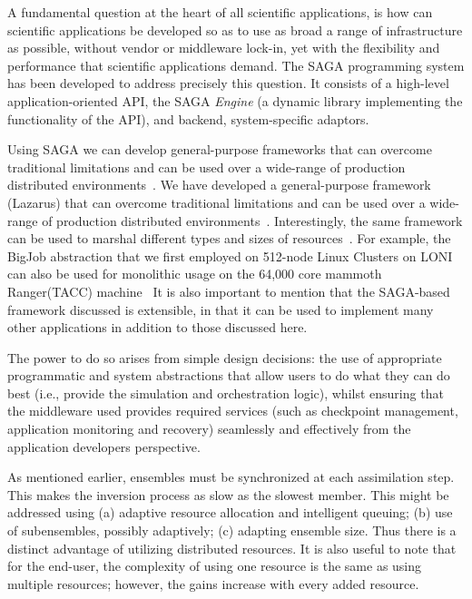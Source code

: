 \documentclass{acm_proc_article-sp}
\newcommand{\jhanote}[1]{ {\textcolor{red} { ***Jha: #1 }}}
\newcommand{\yyenote}[1]{ {\textcolor{blue} { ***yye00: #1 }}}
\newcommand{\jhanote}[1]{}
\newcommand{\yyenote}[1]{}
\begin{document}
A fundamental question at the heart of all scientific applications, is
how can scientific applications be developed so as to use as broad a
range of infrastructure as possible, without vendor or middleware
lock-in, yet with the flexibility and performance that scientific
applications demand. The SAGA programming system has been developed to
address precisely this question. It consists of a high-level
application-oriented API, the SAGA {\it Engine} (a dynamic library
implementing the functionality of the API), and backend,
system-specific adaptors.

Using SAGA we can develop general-purpose frameworks that can overcome
traditional limitations and can be used over a wide-range of production
distributed environments~\cite{saga-royalsoc}. We have developed a general-purpose
framework (Lazarus) that can overcome traditional
limitations and can be used over a wide-range of production
distributed environments~\cite{saga-royalsoc}.  %
Interestingly, the same framework can be used to marshal different
types and sizes of resources~\cite{saga-papers}. For example, the
BigJob abstraction that we first employed on 512-node Linux Clusters
on LONI can also be used for monolithic usage on the 64,000 core
mammoth Ranger(TACC)
machine~\cite{saga-iccs09} %
It is also important to mention that the SAGA-based framework
discussed is extensible, in that it can be used to implement many
other applications in addition to those discussed here.

The power to do so arises from simple design decisions: the use of
appropriate programmatic and system abstractions that allow users to
do what they can do best (i.e., provide the simulation and
orchestration logic), whilst ensuring that the middleware used
provides required services (such as checkpoint management, application
monitoring and recovery) seamlessly and effectively from the
application developers perspective. 

As mentioned earlier, ensembles must be synchronized at each
assimilation step. This makes the inversion process as slow as the
slowest member. This might be addressed using (a) adaptive resource
allocation and intelligent queuing; (b) use of subensembles, possibly
adaptively; (c) adapting ensemble size.  Thus there is a distinct
advantage of utilizing distributed resources.  It is also useful to
note that for the end-user, the complexity of using one resource is
the same as using multiple resources; however, the gains increase with
every added resource.
\end{document}
